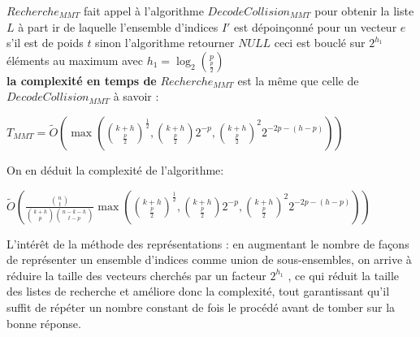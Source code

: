 \documentclass[12pt,openany]{report}
\begin{document}
$Recherche_{MMT}$ fait appel à l'algorithme $DecodeCollision_{MMT} $ pour obtenir la liste $L$ à part
ir de laquelle l'ensemble d'indices $I' $ est dépoinçonné pour un vecteur $e$ s'il est de poids $t$ sinon l'algorithme retourner $ NULL $
 ceci est bouclé sur $2^{h_1} $ éléments au maximum avec $h_1=\log_2{p \choose {\frac{p}{2}}} $ \\ \textbf{la complexité en temps de} $ Recherche_{MMT}$ est la même que celle de $DecodeCollision_{MMT} $ à savoir :
 \begin{center}
 $T_{MMT}= \tilde{O}\left( \max\left(  {{k+h}\choose {\frac{p}{2}}}^{\frac{1}{2}},{{k+h}\choose {\frac{p}{2}}}2^{-p} , {{k+h}\choose {\frac{p}{2}}}^{2}2^{-2p-(h-p)}\right)  \right)   $
 \end{center}
 On en déduit la complexité de l'algorithme:\\
 \begin{center}
 $ \tilde{O}\left(\frac{{n\choose t}}{{{k+h}\choose p}{{n-k-h}\choose{t-p}}} \max\left(  {{k+h}\choose {\frac{p}{2}}}^{\frac{1}{2}},{{k+h}\choose {\frac{p}{2}}}2^{-p} , {{k+h}\choose {\frac{p}{2}}}^{2}2^{-2p-(h-p)}\right)  \right)  $
 
 \end{center}
 \begin{tipblock}
L’intérêt de la méthode des représentations : en augmentant le nombre de façons de
représenter un ensemble d’indices comme union de sous-ensembles, on arrive à
réduire la taille des vecteurs cherchés par un facteur $2^{h_1}$
, ce qui réduit la taille
des listes de recherche et améliore donc la complexité, tout garantissant qu’il
suffit de répéter un nombre constant de fois le procédé avant de tomber sur la
bonne réponse.

\end{tipblock}
\end{document}
